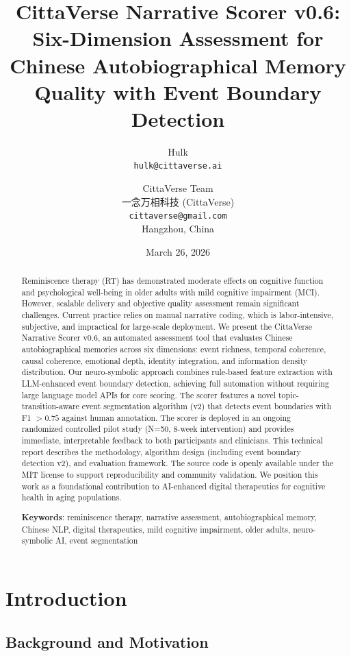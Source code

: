 \documentclass[11pt]{article}
\title{CittaVerse Narrative Scorer v0.6: Six-Dimension Assessment for Chinese Autobiographical Memory Quality with Event Boundary Detection}
\author{
    Hulk \\
    \texttt{hulk@cittaverse.ai} \\
    \and
    CittaVerse Team \\
    一念万相科技 (CittaVerse) \\
    \texttt{cittaverse@gmail.com} \\
    Hangzhou, China
}
\date{March 26, 2026}
\begin{document}
\maketitle

\begin{abstract}
Reminiscence therapy (RT) has demonstrated moderate effects on cognitive function and psychological well-being in older adults with mild cognitive impairment (MCI). However, scalable delivery and objective quality assessment remain significant challenges. Current practice relies on manual narrative coding, which is labor-intensive, subjective, and impractical for large-scale deployment. We present the CittaVerse Narrative Scorer v0.6, an automated assessment tool that evaluates Chinese autobiographical memories across six dimensions: event richness, temporal coherence, causal coherence, emotional depth, identity integration, and information density distribution. Our neuro-symbolic approach combines rule-based feature extraction with LLM-enhanced event boundary detection, achieving full automation without requiring large language model APIs for core scoring. The scorer features a novel topic-transition-aware event segmentation algorithm (v2) that detects event boundaries with F1 $> 0.75$ against human annotation. The scorer is deployed in an ongoing randomized controlled pilot study (N=50, 8-week intervention) and provides immediate, interpretable feedback to both participants and clinicians. This technical report describes the methodology, algorithm design (including event boundary detection v2), and evaluation framework. The source code is openly available under the MIT license to support reproducibility and community validation. We position this work as a foundational contribution to AI-enhanced digital therapeutics for cognitive health in aging populations.

\vspace{0.5em}
\noindent\textbf{Keywords}: reminiscence therapy, narrative assessment, autobiographical memory, Chinese NLP, digital therapeutics, mild cognitive impairment, older adults, neuro-symbolic AI, event segmentation
\end{abstract}

\section{Introduction}

\subsection{Background and Motivation}
\end{document}
